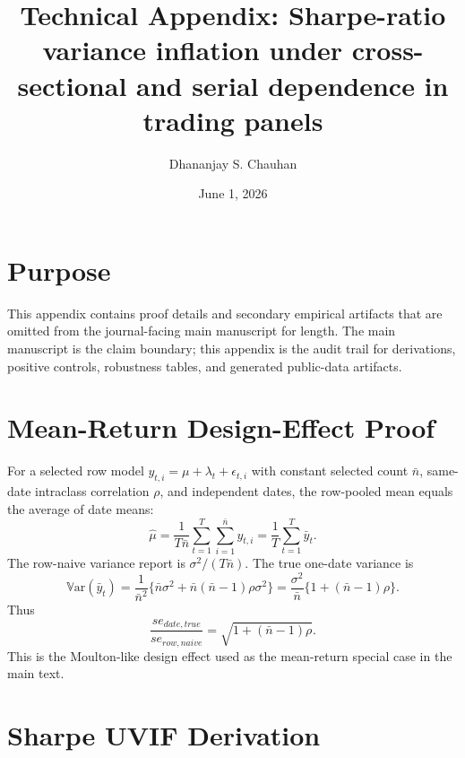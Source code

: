 \documentclass[12pt,a4paper]{article}
\title{Technical Appendix: Sharpe-ratio variance inflation under cross-sectional and serial dependence in trading panels}
\author{Dhananjay S. Chauhan}
\date{June 1, 2026}
\newcommand{\Var}{\mathbb{V}\mathrm{ar}}
\begin{document}
\maketitle

\section{Purpose}

This appendix contains proof details and secondary empirical artifacts
that are omitted from the journal-facing main manuscript for length.
The main manuscript is the claim boundary; this appendix is the audit
trail for derivations, positive controls, robustness tables, and
generated public-data artifacts.

\section{Mean-Return Design-Effect Proof}

For a selected row model \(y_{t,i}=\mu+\lambda_t+\epsilon_{t,i}\) with
constant selected count \(\bar n\), same-date intraclass correlation
\(\rho\), and independent dates, the row-pooled mean equals the average
of date means:
\[
  \hat\mu =
  \frac{1}{T\bar n}\sum_{t=1}^{T}\sum_{i=1}^{\bar n} y_{t,i}
  =
  \frac{1}{T}\sum_{t=1}^{T}\bar y_t .
\]
The row-naive variance report is \(\sigma^2/(T\bar n)\).  The true
one-date variance is
\[
  \Var(\bar y_t)
  =
  \frac{1}{\bar n^2}
  \{\bar n\sigma^2+\bar n(\bar n-1)\rho\sigma^2\}
  =
  \frac{\sigma^2}{\bar n}\{1+(\bar n-1)\rho\}.
\]
Thus
\[
  \frac{se_{date,true}}{se_{row,naive}}
  =
  \sqrt{1+(\bar n-1)\rho}.
\]
This is the Moulton-like design effect used as the mean-return special
case in the main text.

\section{Sharpe UVIF Derivation}
\end{document}
